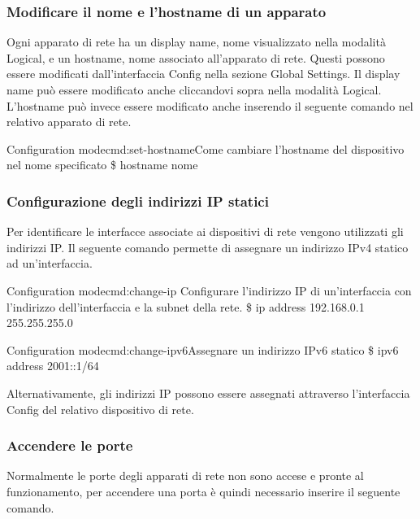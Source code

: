 \subsubsection{Modificare il nome e l'hostname di un apparato}
Ogni apparato di rete ha un display name, nome visualizzato nella modalità Logical, e un hostname, nome associato all'apparato di rete. Questi possono essere modificati dall'interfaccia Config nella sezione Global Settings. Il display name può essere modificato anche cliccandovi sopra nella modalità Logical. L'hostname può invece essere modificato anche inserendo il seguente comando nel relativo apparato di rete.

\begin{cmds}[Router]{Configuration mode}{cmd:set-hostname}{Come cambiare l'hostname del dispositivo nel \textcolor{Highlight1}{nome specificato}}
    \$ hostname \textcolor{Highlight1}{nome}
\end{cmds}

\subsubsection{Configurazione degli indirizzi IP statici}
Per identificare le interfacce associate ai dispositivi di rete vengono utilizzati gli indirizzi IP. Il seguente comando permette di assegnare un indirizzo IPv4 statico ad un'interfaccia.

\begin{cmds}[Interface]{Configuration mode}{cmd:change-ip}{
    Configurare l'indirizzo IP di un'interfaccia con l'\textcolor{Highlight1}{indirizzo dell'interfaccia} e la \textcolor{Highlight2}{subnet della rete}.
}
    \$ ip address \textcolor{Highlight1}{192.168.0.1} \textcolor{Highlight2}{255.255.255.0}
\end{cmds}

\begin{cmds}{Configuration mode}{cmd:change-ipv6}{Assegnare un indirizzo IPv6 statico}
    \$ ipv6 address \textcolor{Highlight1}{2001::1}/\textcolor{Highlight3}{64} %
\end{cmds}

Alternativamente, gli indirizzi IP possono essere assegnati attraverso l'interfaccia Config del relativo dispositivo di rete. 

\subsubsection{Accendere le porte}
Normalmente le porte degli apparati di rete non sono accese e pronte al funzionamento, per accendere una porta è quindi necessario inserire il seguente comando.

